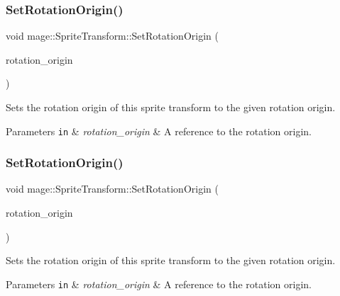 \subsubsection{\texorpdfstring{Set\+Rotation\+Origin()}{SetRotationOrigin()}\hspace{0.1cm}{\footnotesize\ttfamily [2/4]}}
{\footnotesize\ttfamily void mage\+::\+Sprite\+Transform\+::\+Set\+Rotation\+Origin (\begin{DoxyParamCaption}\item[{const X\+M\+F\+L\+O\+A\+T2 \&}]{rotation\+\_\+origin }\end{DoxyParamCaption})\hspace{0.3cm}{\ttfamily [noexcept]}}

Sets the rotation origin of this sprite transform to the given rotation origin.


\begin{DoxyParams}[1]{Parameters}
\mbox{\tt in}  & {\em rotation\+\_\+origin} & A reference to the rotation origin. \\
\hline
\end{DoxyParams}
\hypertarget{structmage_1_1_sprite_transform_a532771d53e650543d125ffb652671388}{}\label{structmage_1_1_sprite_transform_a532771d53e650543d125ffb652671388} 
\subsubsection{\texorpdfstring{Set\+Rotation\+Origin()}{SetRotationOrigin()}\hspace{0.1cm}{\footnotesize\ttfamily [3/4]}}
{\footnotesize\ttfamily void mage\+::\+Sprite\+Transform\+::\+Set\+Rotation\+Origin (\begin{DoxyParamCaption}\item[{X\+M\+F\+L\+O\+A\+T2 \&\&}]{rotation\+\_\+origin }\end{DoxyParamCaption})\hspace{0.3cm}{\ttfamily [noexcept]}}

Sets the rotation origin of this sprite transform to the given rotation origin.


\begin{DoxyParams}[1]{Parameters}
\mbox{\tt in}  & {\em rotation\+\_\+origin} & A reference to the rotation origin. \\
\hline
\end{DoxyParams}
\hypertarget{structmage_1_1_sprite_transform_acbb3eebc3fd26d616f5e4ca75a8c112b}{}\label{structmage_1_1_sprite_transform_acbb3eebc3fd26d616f5e4ca75a8c112b} 

